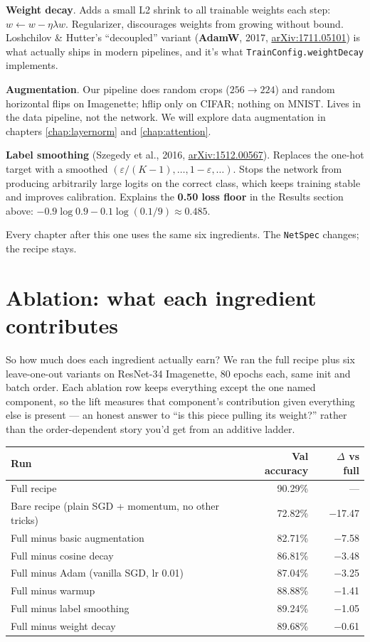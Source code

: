 \textbf{Weight decay}. Adds a small L2 shrink to all trainable weights
each step: $w \leftarrow w - \eta \lambda w$. Regularizer, discourages
weights from growing without bound. Loshchilov \& Hutter's
``decoupled'' variant (\textbf{AdamW}, 2017,
\href{https://arxiv.org/abs/1711.05101}{arXiv:1711.05101}) is what
actually ships in modern
pipelines, and it's what \texttt{TrainConfig.weightDecay} implements.

\textbf{Augmentation}. Our pipeline does random crops ($256 \to 224$)
and random horizontal flips on Imagenette; hflip only on CIFAR;
nothing on MNIST. Lives in the data pipeline, not the network. We
will explore data augmentation in chapters \ref{chap:layernorm}
and \ref{chap:attention}.

\textbf{Label smoothing} (Szegedy et al., 2016,
\href{https://arxiv.org/abs/1512.00567}{arXiv:1512.00567}). Replaces
the one-hot
target with a smoothed $(\varepsilon / (K-1), \ldots, 1 - \varepsilon,
\ldots)$. Stops the network from producing arbitrarily large logits on
the correct class, which keeps training stable and improves calibration.
Explains the \textbf{0.50 loss floor} in the Results section above:
$-0.9 \log 0.9 - 0.1 \log (0.1/9) \approx 0.485$.

Every chapter after this one uses the same six ingredients. The
\texttt{NetSpec} changes; the recipe stays.

\section{Ablation: what each ingredient contributes}
\label{sec:r34_ablation}

So how much does each ingredient actually earn? We ran the full
recipe plus six leave-one-out variants on ResNet-34 Imagenette, 80
epochs each, same init and batch order. Each ablation row keeps
everything except the one named component, so the lift measures
that component's contribution given everything else is present ---
an honest answer to ``is this piece pulling its weight?'' rather
than the order-dependent story you'd get from an additive ladder.

\begin{center}
\begin{tabular}{l r r}
\hline
Run & Val accuracy & $\Delta$ vs full \\
\hline
Full recipe             & 90.29\% & --- \\
Bare recipe (plain SGD + momentum, no other tricks) & 72.82\% & $-$17.47 \\
Full minus basic augmentation & 82.71\% & $-$7.58 \\
Full minus cosine decay & 86.81\% & $-$3.48 \\
Full minus Adam (vanilla SGD, lr 0.01) & 87.04\% & $-$3.25 \\
Full minus warmup       & 88.88\% & $-$1.41 \\
Full minus label smoothing & 89.24\% & $-$1.05 \\
Full minus weight decay & 89.68\% & $-$0.61 \\
\hline
\end{tabular}
\end{center}

